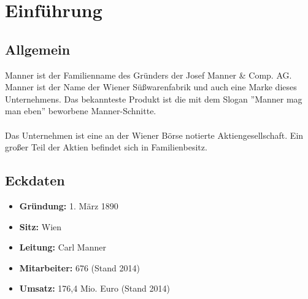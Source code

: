\section{Einführung}
\subsection{Allgemein}
Manner ist der Familienname des Gründers der Josef Manner \& Comp. AG. Manner ist der Name der Wiener Süßwarenfabrik und auch eine Marke dieses Unternehmens. Das bekannteste Produkt ist die mit dem Slogan ''Manner mag man eben'' beworbene Manner-Schnitte. \cite{wiki_manner} \\\\
\noindent
Das Unternehmen ist eine an der Wiener Börse notierte Aktiengesellschaft. Ein großer Teil der Aktien befindet sich in Familienbesitz. \cite{wiki_manner}
\subsection{Eckdaten}
\begin{itemize}
\item \textbf{Gründung: } 1. März 1890
\item \textbf{Sitz: } Wien
\item \textbf{Leitung: } Carl Manner
\item \textbf{Mitarbeiter: } 676 (Stand 2014)
\item \textbf{Umsatz: } 176,4 Mio. Euro (Stand 2014) 
\end{itemize}
\cite{wiki_manner}